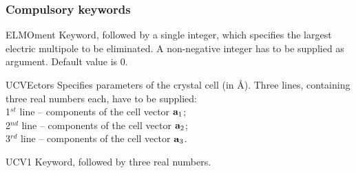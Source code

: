 \subsubsection{Compulsory keywords}
\begin{keywordlist}
\item[ELMOment]
Keyword, followed by a single integer, which specifies the largest electric
multipole to be eliminated.
A non-negative integer has to be supplied as argument.
Default value is 0.
\item[UCVEctors]
Specifies parameters of the crystal cell (in \AA).
Three lines, containing three real numbers each, have to be supplied: \\
\hspace*{5mm}1$^{st}$ line -- components of the cell vector ${\bf a}_1$;\\
\hspace*{5mm}2$^{nd}$ line -- components of the cell vector ${\bf a}_2$;\\
\hspace*{5mm}3$^{rd}$ line -- components of the cell vector ${\bf a}_3$.
\item[UCV1]
Keyword, followed by three real numbers.

\end{keywordlist}
